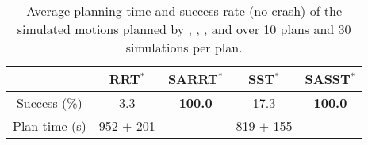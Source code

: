 \begin{table*}[t]
    \centering
    \begin{tabular}{l|llll|}
    \cline{2-5}
        & \multicolumn{1}{c|}{RRT$^{*}$} & \multicolumn{1}{c|}{SARRT$^*$} & \multicolumn{1}{c|}{SST$^*$} & \multicolumn{1}{c|}{SASST$^*$} \\ \hline
    \multicolumn{1}{|c|}{Success (\%)} & \multicolumn{1}{c|}{3.3} & \multicolumn{1}{c|}{\textbf{100.0}}  & \multicolumn{1}{c|}{17.3}  &  \multicolumn{1}{c|}{\textbf{100.0}}   \\ \hline
    \multicolumn{1}{|c|}{Plan time (s)} & \multicolumn{1}{c|}{952 $\pm$ 201}   & \multicolumn{1}{c|}{} & \multicolumn{1}{c|}{819 $\pm$ 155}  &   \multicolumn{1}{c|}{ }  \\ \hline
    \end{tabular}
    \caption{
    \label{tab:samp_unicycle}
    Average planning time and success rate (no crash) of the simulated motions planned by , , , and  over 10 plans and 30 simulations per plan.}
\end{table*}